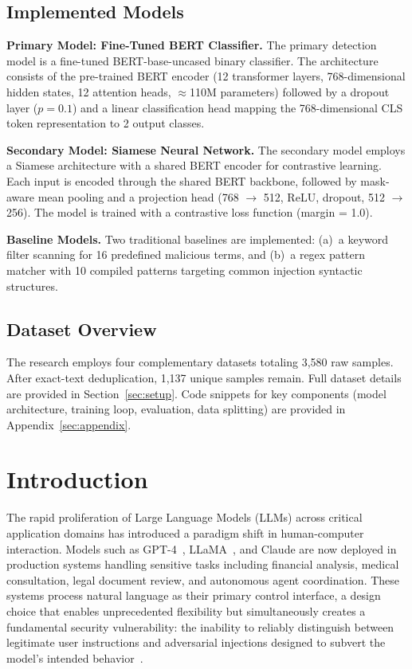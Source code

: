 \documentclass[11pt]{article}
\begin{document}
\subsection*{Implemented Models}

\textbf{Primary Model: Fine-Tuned BERT Classifier.} The primary detection model is a fine-tuned BERT-base-uncased binary classifier. The architecture consists of the pre-trained BERT encoder (12 transformer layers, 768-dimensional hidden states, 12 attention heads, $\approx$110M parameters) followed by a dropout layer ($p=0.1$) and a linear classification head mapping the 768-dimensional CLS token representation to 2 output classes.

\textbf{Secondary Model: Siamese Neural Network.} The secondary model employs a Siamese architecture with a shared BERT encoder for contrastive learning. Each input is encoded through the shared BERT backbone, followed by mask-aware mean pooling and a projection head (768 $\to$ 512, ReLU, dropout, 512 $\to$ 256). The model is trained with a contrastive loss function (margin = 1.0).

\textbf{Baseline Models.} Two traditional baselines are implemented: (a)~a keyword filter scanning for 16 predefined malicious terms, and (b)~a regex pattern matcher with 10 compiled patterns targeting common injection syntactic structures.

\subsection*{Dataset Overview}

The research employs four complementary datasets totaling 3,580 raw samples. After exact-text deduplication, 1,137 unique samples remain. Full dataset details are provided in Section~\ref{sec:setup}. Code snippets for key components (model architecture, training loop, evaluation, data splitting) are provided in Appendix~\ref{sec:appendix}.

\section{Introduction}
\label{sec:intro}

The rapid proliferation of Large Language Models (LLMs) across critical application domains has introduced a paradigm shift in human-computer interaction. Models such as GPT-4~\cite{openai2023gpt4}, LLaMA~\cite{touvron2023llama}, and Claude are now deployed in production systems handling sensitive tasks including financial analysis, medical consultation, legal document review, and autonomous agent coordination. These systems process natural language as their primary control interface, a design choice that enables unprecedented flexibility but simultaneously creates a fundamental security vulnerability: the inability to reliably distinguish between legitimate user instructions and adversarial injections designed to subvert the model's intended behavior~\cite{perez2022ignore}.
\end{document}

